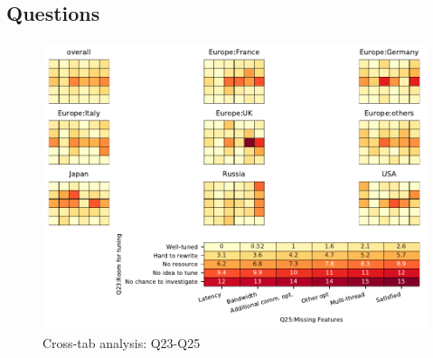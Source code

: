 
\subsection{Questions}


\begin{figure}
\begin{center}
\includegraphics[width=12cm]{../pdfs/Q23-Q25.pdf}
\caption{Cross-tab analysis: Q23-Q25}
\label{fig:Q23-Q25}
\end{center}
\end{figure}

